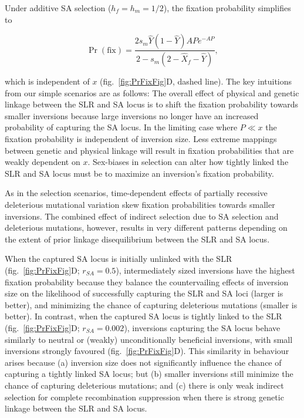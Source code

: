 \documentclass{article}[12pt]
\begin{document}
Under additive SA selection ($h_f = h_m = 1/2$), the fixation probability simplifies to
\begin{linenomath*}
\begin{equation}\label{eq:SAsIpFix2LocLinked}
	\Pr(\text{fix}) = \frac{ 2 s_m \hat{Y} (1 - \hat{Y}) A P e^{-A P}}{ 2 - s_m (2 - \hat{X}_f - \hat{Y}) },
\end{equation}
\end{linenomath*}

\noindent which is independent of $x$ (fig.~\ref{fig:PrFixFig}D, dashed line). The key intuitions from our simple scenarios are as follows: The overall effect of physical and genetic linkage between the SLR and SA locus is to shift the fixation probability towards smaller inversions because large inversions no longer have an increased probability of capturing the SA locus. In the limiting case where $P \ll x$ the fixation probability is independent of inversion size. Less extreme mappings between genetic and physical linkage will result in fixation probabilities that are weakly dependent on $x$. Sex-biases in selection can alter how tightly linked the SLR and SA locus must be to maximize an inversion's fixation probability.

As in the selection scenarios, time-dependent effects of partially recessive deleterious mutational variation skew fixation probabilities towards smaller inversions. The combined effect of indirect selection due to SA selection and deleterious mutations, however, results in very different patterns depending on the extent of prior linkage disequilibrium between the SLR and SA locus. 

When the captured SA locus is initially unlinked with the SLR (fig.~\ref{fig:PrFixFig}D; $r_{SA} = 0.5$), intermediately sized inversions have the highest fixation probability because they balance the countervailing effects of inversion size on the likelihood of successfully capturing the SLR and SA loci (larger is better), and minimizing the chance of capturing deleterious mutations (smaller is better). In contrast, when the captured SA locus is tightly linked to the SLR (fig.~\ref{fig:PrFixFig}D; $r_{SA} = 0.002$), inversions capturing the SA locus behave similarly to neutral or (weakly) unconditionally beneficial inversions, with small inversions strongly favoured (fig.~\ref{fig:PrFixFig}D). This similarity in behaviour arises because (a) inversion size does not significantly influence the chance of capturing a tightly linked SA locus; but (b) smaller inversions still minimize the chance of capturing deleterious mutations; and (c) there is only weak indirect selection for complete recombination suppression when there is strong genetic linkage between the SLR and SA locus.
\end{document}
